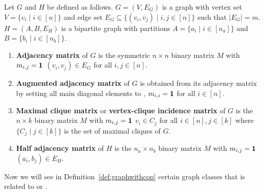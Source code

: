 \begin{definition}
  \label{def:graphmatrices} 
  Let $G$ and $H$ be defined as follows. $G = (V,E_G)$ is a graph with
  vertex set $V = \{v_i \mid i \in [n]\}$ and edge set $E_G \subseteq
  \{(v_i,v_j) \mid i, j \in [n]\}$ such that $|E_G| = m$. $H = (A, B,
  E_H)$ is a bipartite graph with partitions $A = \{a_i \mid i \in
  [n_a]\}$ and $B = \{b_i \mid i \in [n_b]\}$.
  \begin{enumerate}
  \item \textbf{Adjacency matrix} of $G$ is the symmetric $n \times n$
    binary matrix $M$ with $m_{i,j} = \textbf{1}$ \iff $(v_i,v_j) \in E_G$
    for all $i,j \in [n]$.
  \item \textbf{Augmented adjacency matrix} of $G$ is obtained from its
    adjacency matrix by setting all main diagonal elements to \un, \ie
    $m_{i,i} = \textbf{1}$ for all $i \in [n]$.
  \item \textbf{Maximal clique matrix} or \textbf{vertex-clique incidence
      matrix} of $G$ is the $n \times k$ binary matrix $M$ with
    $m_{i,j} = \textbf{1}$ \iff $v_i \in C_j$ for all $i \in [n], j \in [k]$
    where $\{C_j \mid j \in [k]\}$ is the set of maximal cliques of
    $G$.
    \label{def::maxcliquematrix}
  \item \textbf{Half adjacency matrix} of $H$ is the $n_a \times n_b$
    binary matrix $M$ with $m_{i,j} = \textbf{1}$ \iff $(a_i, b_j) \in E_H$.
  \end{enumerate}
\end{definition}

\figgraphmatrices

Now we will see in Definition~\ref{def:graphwithcop} certain graph
classes that is related to \COP or \CROP.\\

